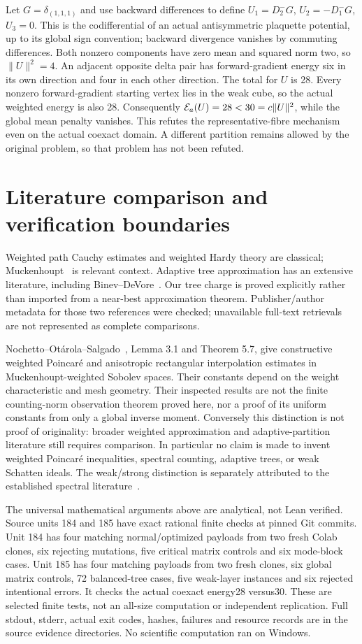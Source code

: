 Let $G=\delta_{(1,1,1)}$ and use backward differences to define
$U_1=D_2^-G$, $U_2=-D_1^-G$, $U_3=0$. This is the codifferential of
an actual antisymmetric plaquette potential, up to its global sign
convention; backward divergence vanishes by commuting differences.
Both nonzero components have zero mean and squared norm two, so
$\|U\|^2=4$. An adjacent opposite delta pair has forward-gradient
energy six in its own direction and four in each other direction.
The total for $U$ is 28. Every nonzero forward-gradient starting vertex
lies in the weak cube, so the actual weighted energy is also 28.
Consequently $\mathcal E_a(U)=28<30=c\|U\|^2$, while the global mean penalty
vanishes. This refutes the representative-fibre mechanism even on the
actual coexact domain. A different partition remains allowed by the
original problem, so that problem has not been refuted.

\section{Literature comparison and verification boundaries}
Weighted path Cauchy estimates and weighted Hardy theory are classical;
Muckenhoupt~\cite{lg:muckenhoupt} is relevant context. Adaptive tree
approximation has an extensive literature, including
Binev--DeVore~\cite{lg:binev}. Our tree charge is proved explicitly rather
than imported from a near-best approximation theorem. Publisher/author
metadata for those two references were checked; unavailable full-text
retrievals are not represented as complete comparisons.

Nochetto--Ot\'arola--Salgado~\cite{lg:nos}, Lemma 3.1 and Theorem 5.7,
give constructive weighted Poincar\'e and anisotropic rectangular
interpolation estimates in Muckenhoupt-weighted Sobolev spaces.
Their constants depend on the weight characteristic and mesh geometry.
Their inspected results are not the finite counting-norm observation
theorem proved here, nor a proof of its uniform constants from only a
global inverse moment. Conversely this distinction is not proof of
originality: broader weighted approximation and adaptive-partition
literature still requires comparison. In particular no claim is made to
invent weighted Poincar\'e inequalities, spectral counting, adaptive trees,
or weak Schatten ideals. The weak/strong distinction is separately
attributed to the established spectral literature~\cite{lg:frank}.

The universal mathematical arguments above are analytical, not Lean
verified. Source units 184 and 185 have exact rational finite checks at
pinned Git commits. Unit 184 has four matching normal/optimized payloads
from two fresh Colab clones, six rejecting mutations, five critical matrix
controls and six mode-block cases. Unit 185 has four matching payloads
from two fresh clones, six global matrix controls, 72 balanced-tree cases,
five weak-layer instances and six rejected intentional errors. It checks
the actual coexact energy28 versus30. These are selected finite tests,
not an all-size computation or independent replication. Full stdout,
stderr, actual exit codes, hashes, failures and resource records are in
the source evidence directories. No scientific computation ran on Windows.

